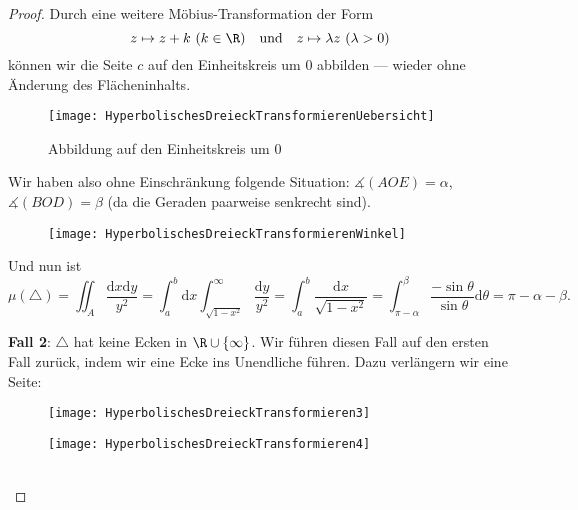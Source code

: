 \begin{remark}
\begin{enumerate}
\begin{proof}
      Durch eine weitere Möbius-Transformation der Form
      \begin{equation*}
        z \mapsto z + k \ (k \in \R) \quad \text{und} \quad z \mapsto \lambda z \ (\lambda > 0)
      \end{equation*}
      können wir die Seite \( c \) auf den Einheitskreis um \( 0 \) abbilden --- wieder ohne Änderung des Flächeninhalts.

      \begin{figure}[H]
        \texttt{[image: HyperbolischesDreieckTransformierenUebersicht]}
        \caption{Abbildung auf den Einheitskreis um \( 0 \)}
      \end{figure}

      \begin{minipage}{.475\textwidth}
        Wir haben also ohne Einschränkung folgende Situation: \( \measuredangle(AOE) = \alpha \), \( \measuredangle(BOD) = \beta \) (da die Geraden paarweise senkrecht sind).
      \end{minipage}
      \hfill
      \begin{minipage}{.475\textwidth}
        \begin{figure}[H]
          \texttt{[image: HyperbolischesDreieckTransformierenWinkel]}
        \end{figure}
      \end{minipage}

      Und nun ist
      \begin{equation*}
        \mu(\triangle) = \iint_A \frac{\text{d}x\text{d}y}{y^2} = \int_a^b \text{d}x \int_{\sqrt{1-x^2}}^\infty \frac{\text{d}y}{y^2} = \int_a^b \frac{\text{d}x}{\sqrt{1-x^2}} = \int_{\pi - \alpha}^\beta \frac{-\sin \theta}{\sin \theta}\text{d}\theta = \pi - \alpha - \beta\text{.}
      \end{equation*}

      \textbf{Fall 2}: \( \triangle \) hat keine Ecken in \( \R \cup \left \{ \infty \right \} \). Wir führen diesen Fall auf den ersten Fall zurück, indem wir eine Ecke ins Unendliche führen. Dazu verlängern wir eine Seite:

      \begin{minipage}{.475\textwidth}
        \begin{figure}[H]
          \texttt{[image: HyperbolischesDreieckTransformieren3]}
        \end{figure}
      \end{minipage}
      \hfill
      \begin{minipage}{.475\textwidth}
        \begin{figure}[H]
          \texttt{[image: HyperbolischesDreieckTransformieren4]}
        \end{figure}
      \end{minipage}
      \  \\


\end{proof}
\end{enumerate}
\end{remark}
